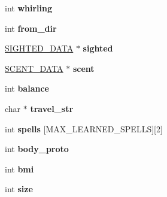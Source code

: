 \begin{DoxyCompactItemize}
\item 
\hypertarget{structchar__data_a0463aadabddfde6ba5f77a29af7f96b3}{int {\bfseries whirling}}\label{structchar__data_a0463aadabddfde6ba5f77a29af7f96b3}

\item 
\hypertarget{structchar__data_a01dd4395da357ea7f8643bd3c89176b9}{int {\bfseries from\-\_\-dir}}\label{structchar__data_a01dd4395da357ea7f8643bd3c89176b9}

\item 
\hypertarget{structchar__data_a2486721d1cc32c0f123a2c810d4b75ae}{\hyperlink{structsighted__data}{S\-I\-G\-H\-T\-E\-D\-\_\-\-D\-A\-T\-A} $\ast$ {\bfseries sighted}}\label{structchar__data_a2486721d1cc32c0f123a2c810d4b75ae}

\item 
\hypertarget{structchar__data_a80055dbb0053f7733dbe26625f8f1c53}{\hyperlink{structscent__data}{S\-C\-E\-N\-T\-\_\-\-D\-A\-T\-A} $\ast$ {\bfseries scent}}\label{structchar__data_a80055dbb0053f7733dbe26625f8f1c53}

\item 
\hypertarget{structchar__data_a0e23aec4bb8d74d92c28d32bc65f3439}{int {\bfseries balance}}\label{structchar__data_a0e23aec4bb8d74d92c28d32bc65f3439}

\item 
\hypertarget{structchar__data_a40c95c367e862d84c88d242a6e128c24}{char $\ast$ {\bfseries travel\-\_\-str}}\label{structchar__data_a40c95c367e862d84c88d242a6e128c24}

\item 
\hypertarget{structchar__data_ac09a999c27b701b68ce0cf5184280628}{int {\bfseries spells} \mbox{[}M\-A\-X\-\_\-\-L\-E\-A\-R\-N\-E\-D\-\_\-\-S\-P\-E\-L\-L\-S\mbox{]}\mbox{[}2\mbox{]}}\label{structchar__data_ac09a999c27b701b68ce0cf5184280628}

\item 
\hypertarget{structchar__data_a91946f6b566493c49968190802f79162}{int {\bfseries body\-\_\-proto}}\label{structchar__data_a91946f6b566493c49968190802f79162}

\item 
\hypertarget{structchar__data_a49ce01da752873bcefece2fdfff29ca8}{int {\bfseries bmi}}\label{structchar__data_a49ce01da752873bcefece2fdfff29ca8}

\item 
\hypertarget{structchar__data_a699b64dc10cf344d241d51c6a8c91d2f}{int {\bfseries size}}\label{structchar__data_a699b64dc10cf344d241d51c6a8c91d2f}


\end{DoxyCompactItemize}
